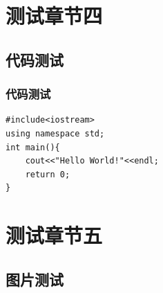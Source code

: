 \documentclass[presentation,aspectratio=1610]{beamer}
\begin{document}

\section{测试章节四}
\subsection{代码测试}

\begin{frame}[fragile] %
\frametitle{代码测试}
\begin{example}
\begin{verbatim}
#include<iostream>
using namespace std;
int main(){
    cout<<"Hello World!"<<endl;
    return 0;
}
\end{verbatim}
\end{example}
\end{frame}

\section{测试章节五}

\subsection{图片测试}
\end{document}
